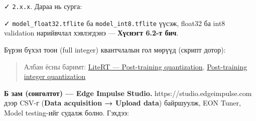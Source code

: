 ✓ \texttt{2.x.x}. Дараа нь сурга:

\begin{Shaded}
\begin{Highlighting}[]
\end{Highlighting}
\end{Shaded}

✓ \texttt{model\_\allowbreak{}float32.\allowbreak{}tflite} ба \texttt{model\_\allowbreak{}int8.\allowbreak{}tflite} үүсэж, float32 ба int8 validation нарийвчлал хэвлэгдэнэ --- \textbf{Хүснэгт 6.2-т бич}.

Бүрэн бүхэл тоон (full integer) квантчлалын гол мөрүүд (скрипт дотор):

\begin{Shaded}
\begin{Highlighting}[]
\OperatorTok{=}
\OperatorTok{=}
\OperatorTok{=}
\OperatorTok{=}
\OperatorTok{=}
\end{Highlighting}
\end{Shaded}

\begin{quote}
Албан ёсны баримт: \href{https://ai.google.dev/edge/litert/conversion/tensorflow/quantization/post_training_quantization}{LiteRT --- Post-training quantization}, \href{https://ai.google.dev/edge/litert/conversion/tensorflow/quantization/post_training_integer_quant}{Post-training integer quantization}
\end{quote}

\textbf{Б зам (сонголтот) --- Edge Impulse Studio.} https://studio.edgeimpulse.com дээр CSV-г (\textbf{Data acquisition → Upload data}) байршуулж, EON Tuner, Model testing-ийг судалж болно. Гэхдээ:

